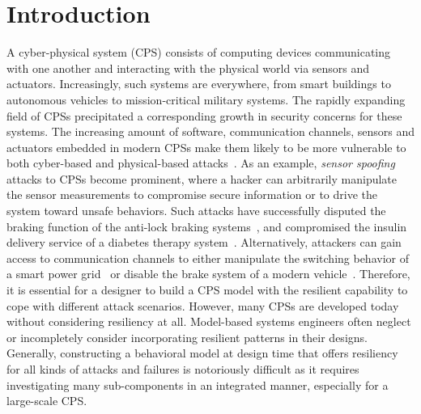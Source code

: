 \section{Introduction}
\label{sec:intro}
A cyber-physical system (CPS) consists of computing devices communicating with one another and interacting with the physical world via sensors and actuators. Increasingly, such systems are everywhere, from smart buildings to autonomous vehicles to mission-critical military systems. 
%
The rapidly expanding field of CPSs precipitated a corresponding growth in security concerns for these systems. The increasing amount of software, communication channels, sensors and actuators embedded in modern CPSs make them likely to be more vulnerable to both cyber-based and physical-based attacks~\cite{wan2015security, wasicek2014aspect, kocher2004security, al2015design, gamage2010enforcing}. As an example, \emph{sensor spoofing} attacks to CPSs become prominent, where a hacker can arbitrarily manipulate the sensor measurements to compromise secure information or to drive the system toward unsafe behaviors. Such attacks have successfully disputed the braking function of the anti-lock braking systems~\cite{Shoukry2013,al2015design}, and compromised the insulin delivery service of a diabetes therapy system~\cite{li2011hijacking}. Alternatively, attackers can gain access to communication channels to either manipulate the switching behavior of a smart power grid~\cite{liu2011class} or disable the brake system of a modern vehicle~\cite{koscher2010experimental}. 
%
Therefore, it is essential for a designer to build a CPS model with the resilient capability to cope with different attack scenarios. However, many CPSs are developed today without considering resiliency at all. Model-based systems engineers often neglect or incompletely consider incorporating resilient patterns in their designs. 
%
%
Generally, constructing a behavioral model at design time that offers resiliency for all kinds of attacks and failures is notoriously difficult as it requires investigating many sub-components in an integrated manner, especially for a large-scale CPS.
%

